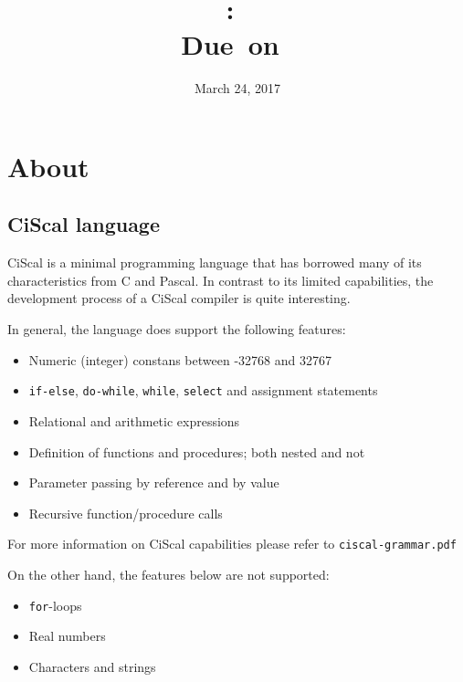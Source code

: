 \documentclass{article}
\title{
\vspace{2in}
\textmd{\textbf{\hmwkClass:\ \hmwkTitle}}\\
\normalsize\vspace{0.1in}\small{Due\ on\ \hmwkDueDate}\\
\vspace{0.1in}\large{\textit{\hmwkClassInstructor}}
\vspace{3in}
}
\author{\textbf{\hmwkAuthorName}}
\date{March 24, 2017} %
\def\code#1{\texttt{#1}} %
\begin{document}
\maketitle


\newpage
\tableofcontents
\newpage


\section{About}

\subsection{CiScal language}
CiScal is a minimal programming language that has borrowed many of its characteristics from C and Pascal.
In contrast to its limited capabilities, the development process of a CiScal compiler is quite interesting.

In general, the language does support the following features:
\begin{itemize}
 \item Numeric (integer) constans between -32768 and 32767
 \item \code{if-else}, \code{do-while}, \code{while}, \code{select} and assignment statements
 \item Relational and arithmetic expressions
 \item Definition of functions and procedures; both nested and not
 \item Parameter passing by reference and by value
 \item Recursive function/procedure calls
\end{itemize}

For more information on CiScal capabilities please refer to \code{ciscal-grammar.pdf}

\vspace{0.5cm}
On the other hand, the features below are not supported:
\begin{itemize}
 \item \code{for}-loops
 \item Real numbers
 \item Characters and strings
\end{itemize}
\end{document}
